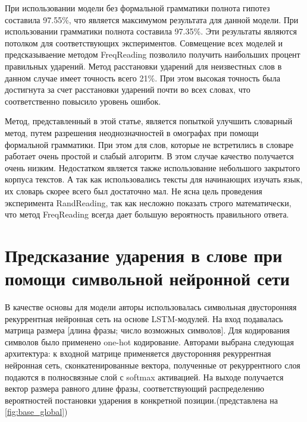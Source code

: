 \documentclass[14pt, a4paper, russian]{report}
\begin{document}
\begin{normalsize}
При использовании модели без формальной грамматики полнота гипотез составила 97.55\%, что является максимумом результата для данной модели. При использовании грамматики полнота составила 97.35\%. Эти результаты являются потолком для соответствующих экспериментов. Совмещение всех моделей и предсказываение методом FreqReading  позволило получить наибольших процент правильных ударений. Метод расстановки ударений для неизвестных слов в данном случае имеет точность всего 21\%. При этом высокая точность была достигнута за счет расстановки ударений почти во всех словах, что соответственно повысило уровень ошибок. 

Метод, представленный в этой статье, является попыткой улучшить словарный метод, путем разрешения неоднозначностей в омографах при помощи формальной грамматики. При этом для слов, которые не  встретились в словаре работает очень простой и слабый алгоритм. В этом случае качество получается очень низким. Недостатком является также использование небольшого закрытого корпуса текстов. А так как использовались тексты для начинающих изучать язык, их словарь скорее всего был достаточно мал. Не ясна цель проведения эксперимента RandReading, так как несложно показать строго математически, что метод FreqReading всегда дает большую вероятность правильного ответа.

\section{Предсказание ударения в слове при помощи символьной нейронной сети}
\label{global_desc}
	В качестве основы для модели авторы \cite{ponomareva} использовалась  символьная двусторонняя рекуррентная нейронная сеть на основе LSTM-модулей. На вход подавалась матрица размера [длина фразы; число возможных символов]. Для кодирования символов было применено one-hot кодирование. Авторами выбрана следующая архитектура: к входной матрице применяется двусторонняя рекуррентная нейронная сеть, сконкатенированные вектора, полученные от рекуррентного слоя подаются в полносвязные слой с softmax активацией. На выходе получается вектор размера равного длине фразы, соответствующий распределению вероятностей постановки ударения в конкретной позиции.(представлена на \cref{fig:base_global})


\end{normalsize}
\end{document}
